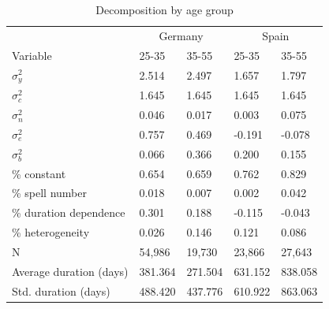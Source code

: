 \documentclass[12pt]{article}
\theoremstyle{definition}
\theoremstyle{remark}
\begin{document}
\begin{appendices}
\begin{table}[htbb!]
    \centering
    \caption{Decomposition by age group}
   \begin{tabular}{lllll}
\toprule
 & \multicolumn{2}{c|}{Germany} & \multicolumn{2}{c}{Spain} \\[5pt]
Variable & 25-35 & 35-55 & 25-35 & 35-55 \\
\midrule
$\sigma^{2}_y$ & 2.514 & 2.497 & 1.657 & 1.797 \\
$\sigma^{2}_c$ & 1.645 & 1.645 & 1.645 & 1.645 \\
$\sigma^{2}_n$ & 0.046 & 0.017 & 0.003 & 0.075 \\
$\sigma^{2}_e$ & 0.757 & 0.469 & -0.191 & -0.078 \\
$\sigma^{2}_b$ & 0.066 & 0.366 & 0.200 & 0.155 \\
\midrule
\% constant & 0.654 & 0.659 & 0.762 & 0.829 \\
\% spell number & 0.018 & 0.007 & 0.002 & 0.042 \\
\% duration dependence & 0.301 & 0.188 & -0.115 & -0.043 \\
\% heterogeneity & 0.026 & 0.146 & 0.121 & 0.086 \\
\hline \hline
N & 54,986 & 19,730 & 23,866 & 27,643 \\
Average duration (days) & 381.364 & 271.504 & 631.152 & 838.058 \\
Std. duration (days) & 488.420 & 437.776 & 610.922 & 863.063 \\
\bottomrule
\end{tabular}
\end{table}

\begin{table}[htbb!]
    \centering
    \caption{Decomposition with age controls}
\end{table}


\end{appendices}
\end{document}
